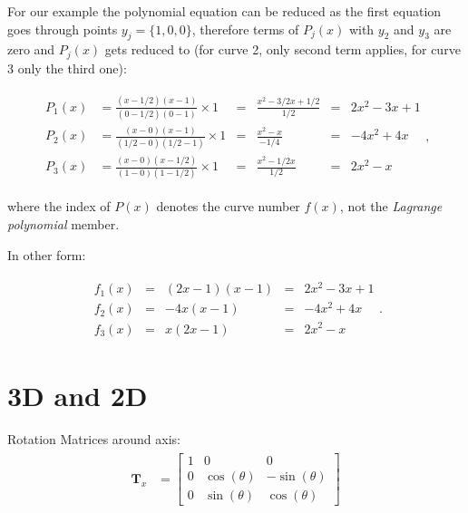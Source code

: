 \documentclass[10pt,b5paper,titlepage]{book}
\begin{document}
For our example the polynomial equation can be reduced as the first equation
goes through points $y_{j} = \{1, 0, 0\}$, therefore terms of $P_{j}(x)$ with
$y_2$ and $y_3$ are zero and $P_{j}(x)$ gets reduced to (for curve 2, only
second term applies, for curve 3 only the third one):

\begin{eqnarray}
    \begin{aligned}
        P_1(x) &= \frac{(x - 1 / 2)(x - 1)}{(0 - 1 / 2)(0 - 1)} \times 1
               &=& \frac{x^{2} - 3 / 2 x + 1 / 2}{1 / 2}
               &=& 2 x^{2} - 3 x + 1 \\
        P_2(x) &= \frac{(x - 0)(x - 1)}{(1 / 2 - 0)(1 / 2 - 1)} \times 1
               &=& \frac{x^{2} - x}{- 1 / 4}
               &=& -4 x^2 + 4 x \\
        P_3(x) &= \frac{(x - 0)(x - 1 / 2)}{(1 - 0)(1 - 1 / 2)} \times 1
               &=& \frac{x^2 - 1 / 2 x}{1 / 2}
               &=& 2 x^2 - x
    \end{aligned}
,\end{eqnarray}

where the index of $P(x)$ denotes the curve number $f(x)$, not the
\textit{Lagrange polynomial} member.

In other form:

\begin{eqnarray}
    \begin{aligned}
        f_1(x) &=& (2 x - 1)(x - 1) &=& 2 x^2 - 3 x + 1 \\
        f_2(x) &=& -4 x (x - 1) &=& -4 x^2 + 4 x\\
        f_3(x) &=& x (2 x - 1) &=& 2 x^2 - x
    \end{aligned}
.\end{eqnarray}


\newpage
\section{3D and 2D}
Rotation Matrices around axis:
\begin{eqnarray}
    \begin{aligned}
        \mathbf{T}_x &=
        \begin{bmatrix}
            1 & 0 & 0 \\
            0 & \cos(\theta) & -\sin(\theta) \\
            0 & \sin(\theta) & \cos(\theta)
        \end{bmatrix}
    \end{aligned}
\end{eqnarray}
\end{document}
